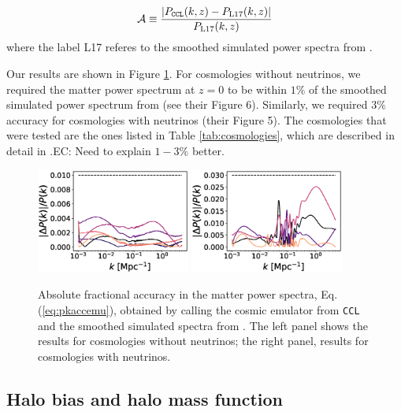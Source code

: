 \documentclass[\docopts]{\docclass}
\newcommand{\elisa}[1]{\textcolor{green!10!orange!90!}{EC: #1}}
\newcommand{\ccl}{{\tt CCL}\xspace}
\begin{document}
\begin{equation}
  \mathcal{A}\equiv\frac{|P_{\tt CCL}(k,z)-P_{\rm L17}(k,z)|}{P_{\rm L17}(k,z)}
  \label{eq:pkaccemu}
\end{equation}
where the label L17 referes to the smoothed simulated power spectra from \citet{Lawrence17}.

Our results are shown in Figure \ref{fig:emuacc}. For cosmologies without neutrinos, we required the matter power spectrum at $z=0$ to be within $1\%$ of the smoothed simulated power spectrum from \citet{Lawrence17} (see their Figure 6). Similarly, we required $3\%$ accuracy for cosmologies with neutrinos (their Figure 5). The cosmologies that were tested are the ones listed in Table \ref{tab:cosmologies}, which are described in detail in \citet{Lawrence17}.\elisa{Need to explain $1-3\%$ better.}

\begin{figure}
  \centering
  \includegraphics[width=0.45\textwidth]{poweremu.eps}
  \includegraphics[width=0.45\textwidth]{poweremu_nu.eps}
  \caption{Absolute fractional accuracy in the matter power spectra, Eq. (\ref{eq:pkaccemu}), obtained by calling the cosmic emulator from \ccl and the smoothed simulated spectra from \citet{Lawrence17}. The left panel shows the results for cosmologies without neutrinos; the right panel, results for cosmologies with neutrinos.}
  \label{fig:emuacc}
\end{figure}

\subsection{Halo bias and halo mass function}
\end{document}

